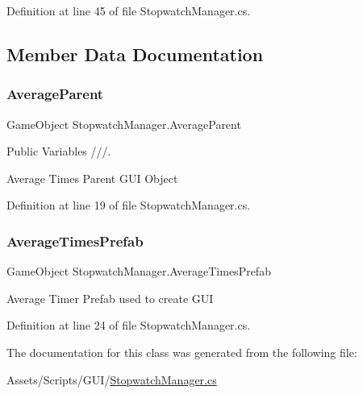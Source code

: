 Definition at line 45 of file Stopwatch\+Manager.\+cs.



\subsection{Member Data Documentation}
\mbox{\label{class_stopwatch_manager_a295face8d1fa1c320c6ecb56dcdf34bf}} 
\subsubsection{\texorpdfstring{Average\+Parent}{AverageParent}}
{\footnotesize\ttfamily Game\+Object Stopwatch\+Manager.\+Average\+Parent}



Public Variables ///. 

Average Times Parent G\+UI Object 

Definition at line 19 of file Stopwatch\+Manager.\+cs.

\mbox{\label{class_stopwatch_manager_aee1fa79b0c39d55909b198dfab997bd0}} 
\subsubsection{\texorpdfstring{Average\+Times\+Prefab}{AverageTimesPrefab}}
{\footnotesize\ttfamily Game\+Object Stopwatch\+Manager.\+Average\+Times\+Prefab}



Average Timer Prefab used to create G\+UI 



Definition at line 24 of file Stopwatch\+Manager.\+cs.



The documentation for this class was generated from the following file\+:\begin{DoxyCompactItemize}
\item 
Assets/\+Scripts/\+G\+U\+I/\mbox{\hyperlink{_stopwatch_manager_8cs}{Stopwatch\+Manager.\+cs}}\end{DoxyCompactItemize}

